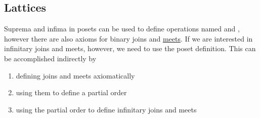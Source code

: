\subsection{Lattices}\label{subsec:lattices}

\begin{remark}\label{remark:infinite_join_meet}
  Suprema and infima in posets can be used to define operations named  and , however there are also axioms for binary joins and \hyperref[def:binary_join_meet]{meets}. If we are interested in infinitary joins and meets, however, we need to use the poset definition. This can be accomplished indirectly by
  \begin{enumerate}
    \item defining joins and meets axiomatically
    \item using them to define a partial order
    \item using the partial order to define infinitary joins and meets
  \end{enumerate}
\end{remark}


